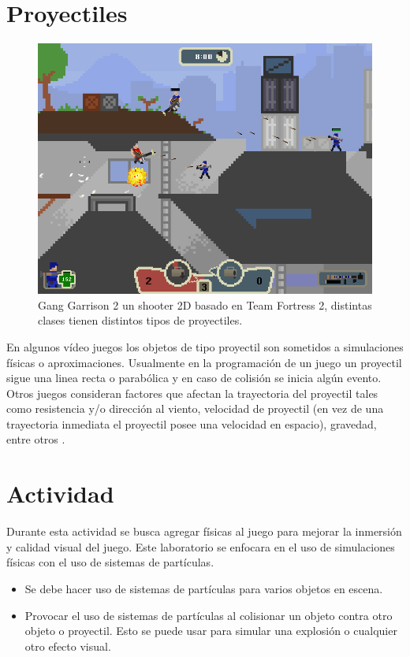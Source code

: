 \section{Proyectiles}
\setlength\intextsep{0pt}
\begin{figure}
\includegraphics[width=\linewidth]{media/Gang_Garrison_2.png}
\caption{Gang Garrison 2 un shooter 2D basado en Team Fortress 2, distintas clases tienen distintos tipos de proyectiles.}
\label{fig:ganggarrison2}
\end{figure}

En algunos vídeo juegos los objetos de tipo proyectil son sometidos a simulaciones físicas o aproximaciones. Usualmente en la programación de un juego un proyectil sigue una linea recta o parabólica y en caso de colisión se inicia algún evento. Otros juegos consideran factores que afectan la trayectoria del proyectil tales como resistencia y/o dirección al viento, velocidad de proyectil (en vez de una trayectoria inmediata el proyectil posee una velocidad en espacio), gravedad, entre otros \cite{fifa_physics}.~\\

\section{Actividad}
Durante esta actividad se busca agregar físicas al juego para mejorar la inmersión y calidad visual del juego. Este laboratorio se enfocara en el uso de simulaciones físicas con el uso de sistemas de partículas.
\begin{itemize}
\item Se debe hacer uso de sistemas de partículas para varios objetos en escena.
\item Provocar el uso de sistemas de partículas al colisionar un objeto contra otro objeto o proyectil. Esto se puede usar para simular una explosión o cualquier otro efecto visual.
\end{itemize}
